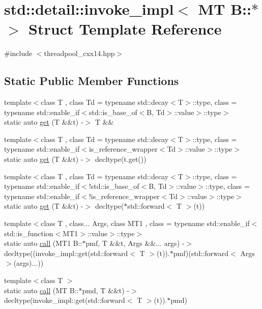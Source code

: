 \hypertarget{structstd_1_1detail_1_1invoke__impl_3_01MT_01B_1_1_5_01_4}{}\section{std\+:\+:detail\+:\+:invoke\+\_\+impl$<$ MT B\+:\+:$\ast$ $>$ Struct Template Reference}
\label{structstd_1_1detail_1_1invoke__impl_3_01MT_01B_1_1_5_01_4}


{\ttfamily \#include $<$threadpool\+\_\+cxx14.\+hpp$>$}

\subsection*{Static Public Member Functions}
\begin{DoxyCompactItemize}
\item 
{\footnotesize template$<$class T , class Td  = typename std\+::decay$<$\+T$>$\+::type, class  = typename std\+::enable\+\_\+if$<$std\+::is\+\_\+base\+\_\+of$<$\+B, Td$>$\+::value$>$\+::type$>$ }\\static auto \hyperlink{structstd_1_1detail_1_1invoke__impl_3_01MT_01B_1_1_5_01_4_a5d586e031aeaa0ce27ab99163560fc29}{get} (T \&\&t) -\/$>$ T \&\&
\item 
{\footnotesize template$<$class T , class Td  = typename std\+::decay$<$\+T$>$\+::type, class  = typename std\+::enable\+\_\+if$<$is\+\_\+reference\+\_\+wrapper$<$\+Td$>$\+::value$>$\+::type$>$ }\\static auto \hyperlink{structstd_1_1detail_1_1invoke__impl_3_01MT_01B_1_1_5_01_4_afe48fd9881ae5854f3e78a5186d5a45f}{get} (T \&\&t) -\/$>$ decltype(t.\+get())
\item 
{\footnotesize template$<$class T , class Td  = typename std\+::decay$<$\+T$>$\+::type, class  = typename std\+::enable\+\_\+if$<$!std\+::is\+\_\+base\+\_\+of$<$\+B, Td$>$\+::value$>$\+::type, class  = typename std\+::enable\+\_\+if$<$!is\+\_\+reference\+\_\+wrapper$<$\+Td$>$\+::value$>$\+::type$>$ }\\static auto \hyperlink{structstd_1_1detail_1_1invoke__impl_3_01MT_01B_1_1_5_01_4_af1601009ad460178914b9cec095d8fca}{get} (T \&\&t) -\/$>$ decltype($\ast$std\+::forward$<$ T $>$(t))
\item 
{\footnotesize template$<$class T , class... Args, class M\+T1 , class  = typename std\+::enable\+\_\+if$<$std\+::is\+\_\+function$<$\+M\+T1$>$\+::value$>$\+::type$>$ }\\static auto \hyperlink{structstd_1_1detail_1_1invoke__impl_3_01MT_01B_1_1_5_01_4_aac8b16a210add2424aa7556354b8d815}{call} (M\+T1 B\+::$\ast$pmf, T \&\&t, Args \&\&... args) -\/$>$ decltype((invoke\+\_\+impl\+::get(std\+::forward$<$ T $>$(t)).$\ast$pmf)(std\+::forward$<$ Args $>$(args)...))
\item 
{\footnotesize template$<$class T $>$ }\\static auto \hyperlink{structstd_1_1detail_1_1invoke__impl_3_01MT_01B_1_1_5_01_4_a8c451a7c858ae8dfd8fc34edf8edfe2a}{call} (MT B\+::$\ast$pmd, T \&\&t) -\/$>$ decltype(invoke\+\_\+impl\+::get(std\+::forward$<$ T $>$(t)).$\ast$pmd)
\end{DoxyCompactItemize}


